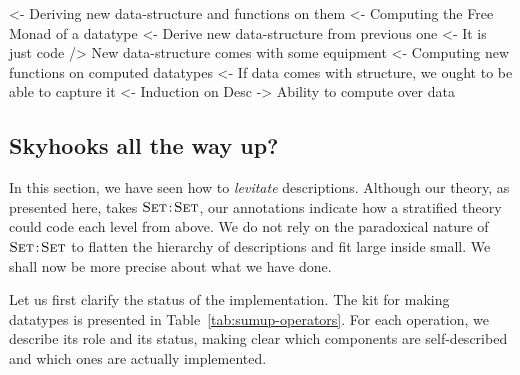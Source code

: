 \begin{wstructure}
<- Deriving new data-structure and functions on them
    <- Computing the Free Monad of a datatype
        <- Derive new data-structure from previous one
            <- It is just code
        /> New data-structure comes with some equipment
    <- Computing new functions on computed datatypes
        <- If data comes with structure, we ought to be able to capture it
            <- Induction on Desc
            -> Ability to compute over data
\end{wstructure}


\subsection{Skyhooks all the way up?}


In this section, we have seen how to \emph{levitate}
descriptions. Although our theory, as presented here, takes
$\Bhab{\Set}{\Set}$, our annotations indicate how a stratified theory
could code each level from above.  We do not rely on the paradoxical
nature of $\Bhab{\Set}{\Set}$ to flatten the hierarchy of descriptions
and fit large inside small.  We shall now be more precise about what
we have done.


Let us first clarify the status of the implementation. The kit for
making datatypes is presented in Table~\ref{tab:sumup-operators}. For
each operation, we describe its role and its status, making clear
which components are self-described and which ones are actually
implemented.


